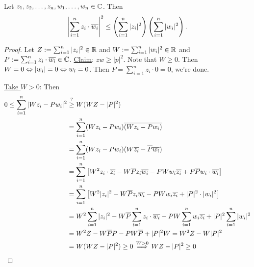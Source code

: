 \documentclass[]{article}
\begin{document}
\begin{theorem}
	 Let $z_1,z_2,\dots,z_n,w_1,\dots,w_n\in\mathbb{C}$. Then $$ \left| \sum_{i=1}^n z_i\cdot \overline{w_i} \right|^2 \leq \left(\sum_{i=1}^n |z_i|^2 \right) \left( \sum_{i=1}^n |w_i|^2\right).$$
\end{theorem}
\begin{proof}
	Let $Z:= \sum_{i=1}^n |z_i|^2 \in\mathbb{R}$ and $W: = \sum_{i=1}^n |w_i|^2\in\mathbb{R}$ and $P:=\sum_{i=1}^n z_i\cdot \overline{w_i}\in\mathbb{C}$. \ul{Claim}: $zw \geq |p|^2$. Note that $W \geq 0$. Then $W = 0 \Leftrightarrow |w_i| = 0 \Leftrightarrow w_i = 0$. Then $P = \sum_{i=1}^n z_i\cdot 0 = 0$, we're done.
	
	\ul{Take $W>0$}: Then 
	\begin{align*}
		0\leq \sum_{i=1}^n |Wz_i - Pw_i|^2 &\overset{?}{\geq} W(WZ-|P|^2) \\
		&= \sum_{i=1}^n(Wz_i-Pw_i)\overline{(Wz_i-Pw_i)} \\
		&= \sum_{i=1}^n(Wz_i-Pw_i)(W\overline{z_i}-\overline{P}\overline{w_i}) \\
		& = \sum_{i=1}^n \left[ W^2 z_i\cdot \overline{z_i} - W\overline{P} z_i \overline{w_i} - PW w_i \overline{z_i} + P\overline{P} w_i \cdot \overline{w_i} \right] \\
		&= \sum_{i=1}^n \left[ W^2|z_i|^2 - W\overline{P} z_i \overline{w_i} - PW w_i \overline{z_i} + |P|^2 \cdot |w_i|^2 \right] \\
		&= W^2 \sum_{i=1}^n |z_i|^2 - W\overline{P}\sum_{i=1}^n z_i \cdot \overline{w_i} - PW \sum_{i=1}^n w_i \overline{z_i} + |P|^2 \sum_{i=1}^n |w_i|^2 \\
		&= W^2 Z  - W\overline{P} P - P W \overline{P} + |P|^2 W = W^2Z - W|P|^2 \\
		&= W(WZ-|P|^2) \geq 0 \overset{W>0}{\implies} WZ-|P|^2 \geq 0
	\end{align*}
\end{proof}
\end{document}
